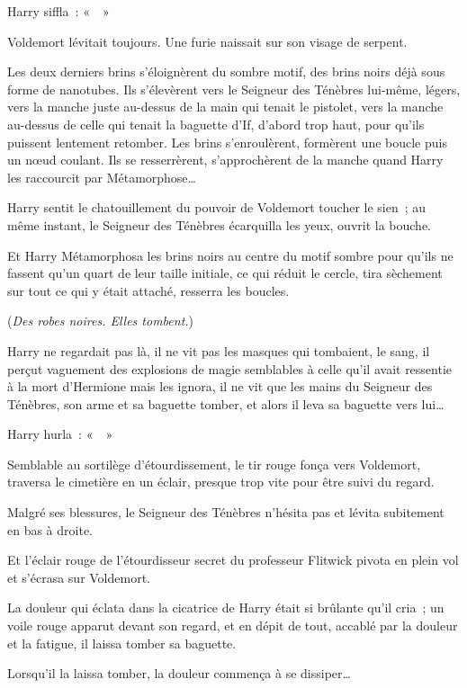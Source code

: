 Harry siffla~: «~~»

Voldemort lévitait toujours. Une furie naissait sur son visage de serpent.

Les deux derniers brins s'éloignèrent du sombre motif, des brins noirs déjà sous forme de nanotubes. Ils s'élevèrent vers le Seigneur des Ténèbres lui-même, légers, vers la manche juste au-dessus de la main qui tenait le pistolet, vers la manche au-dessus de celle qui tenait la baguette d'If, d'abord trop haut, pour qu'ils puissent lentement retomber. Les brins s'enroulèrent, formèrent une boucle puis un nœud coulant. Ils se resserrèrent, s'approchèrent de la manche quand Harry les raccourcit par Métamorphose…

Harry sentit le chatouillement du pouvoir de Voldemort toucher le sien~; au même instant, le Seigneur des Ténèbres écarquilla les yeux, ouvrit la bouche.

Et Harry Métamorphosa les brins noirs au centre du motif sombre pour qu'ils ne fassent qu'un quart de leur taille initiale, ce qui réduit le cercle, tira sèchement sur tout ce qui y était attaché, resserra les boucles.

(\emph{Des robes noires. Elles tombent.})

Harry ne regardait pas là, il ne vit pas les masques qui tombaient, le sang, il perçut vaguement des explosions de magie semblables à celle qu'il avait ressentie à la mort d'Hermione mais les ignora, il ne vit que les mains du Seigneur des Ténèbres, son arme et sa baguette tomber, et alors il leva sa baguette vers lui…

Harry hurla~: «~~»

Semblable au sortilège d'étourdissement, le tir rouge fonça vers Voldemort, traversa le cimetière en un éclair, presque trop vite pour être suivi du regard.

Malgré ses blessures, le Seigneur des Ténèbres n'hésita pas et lévita subitement en bas à droite.

Et l'éclair rouge de l'étourdisseur secret du professeur Flitwick pivota en plein vol et s'écrasa sur Voldemort.

La douleur qui éclata dans la cicatrice de Harry était si brûlante qu'il cria~; un voile rouge apparut devant son regard, et en dépit de tout, accablé par la douleur et la fatigue, il laissa tomber sa baguette.

Lorsqu'il la laissa tomber, la douleur commença à se dissiper…
